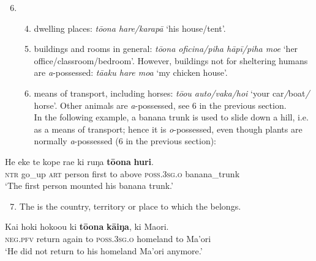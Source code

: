\begin{enumerate}
\setcounter{enumi}{5}
\item[]
\begin{enumerate}
\setcounter{enumii}{3}
\item 
dwelling places: \textit{tō{\ꞌ}ona hare/karapā} ‘his house/tent’.

\item 
buildings and rooms in general: \textit{tō{\ꞌ}ona oficina/piha hāpī/piha moe} ‘her office/classroom/bedroom’. However, buildings not for sheltering humans are \textit{a}{}-possessed: \textit{tā{\ꞌ}aku hare moa} ‘my chicken house’.

\item 
means of transport, including horses: \textit{tō{\ꞌ}ou {\ꞌ}auto/vaka/hoi} ‘your car\textit{/}boat\textit{/} horse’. Other animals are \textit{a}{}-possessed, see 6 in the previous section.\\
In the following example, a banana trunk is used to slide down a hill, i.e. as a means of transport; hence it is \textit{o}{}-possessed, even though plants are normally \textit{a}{}-possessed (6 in the previous section):

\end{enumerate}
\end{enumerate}

\ea\label{ex:6.88}
\gll He eke te kope ra{\ꞌ}e ki ruŋa \textbf{tō{\ꞌ}ona} \textbf{huri}. \\
\textsc{ntr} go\_up \textsc{art} person first to above \textsc{poss.3sg.o} banana\_trunk \\

\glt
‘The first person mounted his banana trunk.’ \textstyleExampleref{[R313.028]} 
\z

\begin{enumerate}
\setcounter{enumi}{6}
\item 
The  is the country, territory or place to which the  belongs.

\end{enumerate}

\ea\label{ex:6.89}
\gll Kai hoki hoko{\ꞌ}ou ki \textbf{tō{\ꞌ}ona} \textbf{kāiŋa}, ki Ma{\ꞌ}ori. \\
\textsc{neg.pfv} return again to \textsc{poss.3sg.o} homeland to Ma’ori \\

\glt 
‘He did not return to his homeland Ma’ori anymore.’ \textstyleExampleref{[MsE-005.004]}
\z

